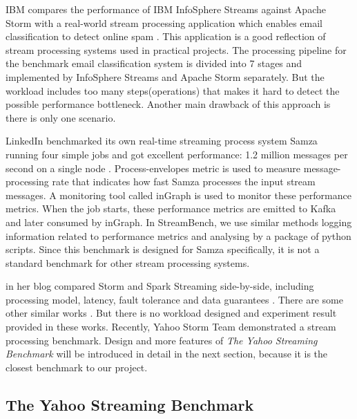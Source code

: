 IBM compares the performance of IBM InfoSphere Streams against Apache Storm with a real-world stream processing application which enables email classification to detect online spam \cite{ibm2014streams}. This application is a good reflection of stream processing systems used in practical projects. The processing pipeline for the benchmark email classification system is divided into 7 stages and implemented by InfoSphere Streams and Apache Storm separately. But the workload includes too many steps(operations) that makes it hard to detect the possible performance bottleneck. Another main drawback of this approach is there is only one scenario. 


LinkedIn benchmarked its own real-time streaming process system Samza running four simple jobs and got excellent performance: 1.2 million messages per second on a single node \cite{samza-benchmark}. Process-envelopes metric is used to measure message-processing rate that indicates how fast Samza processes the input stream messages. A monitoring tool called inGraph is used to monitor these performance metrics. When the job starts, these performance metrics are emitted to Kafka and later consumed by inGraph. In StreamBench, we use similar methods logging information related to performance metrics and analysing by a package of python scripts. Since this benchmark is designed for Samza specifically, it is not a standard benchmark for other stream processing systems.

\citeauthor{xinhstechblog} in her blog compared Storm and Spark Streaming side-by-side, including processing model, latency, fault tolerance and data guarantees \cite{xinhstechblog}. There are some other similar works \cite{manoj-sotrm-vs-spark, manoj-realtime}. But there is no workload designed and experiment result provided in these works. Recently, Yahoo Storm Team demonstrated a stream processing benchmark. Design and more features of \textit{The Yahoo Streaming Benchmark} will be introduced in detail in the next section, because it is the closest benchmark to our project.

\subsection{The Yahoo Streaming Benchmark}
\label{subsection:ysb}


